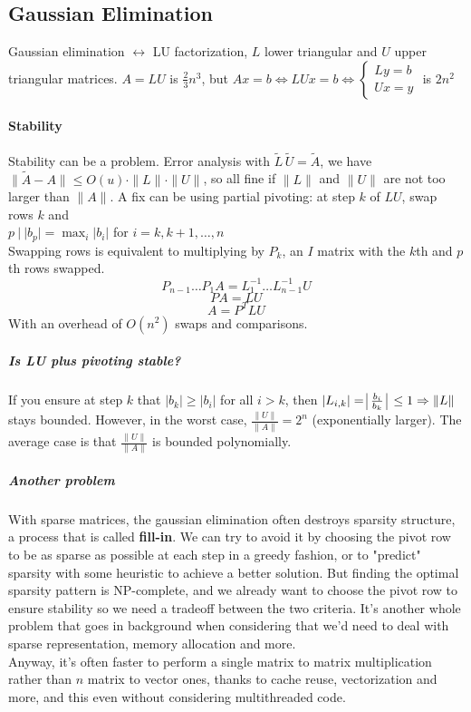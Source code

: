 \documentclass[10pt]{report}
\begin{document}
\subsection{Gaussian Elimination}
Gaussian elimination $\leftrightarrow$ LU factorization, $L$ lower triangular and $U$ upper triangular matrices. $A = LU$ is $\frac{2}{3}n^3$, but $Ax=b\Leftrightarrow LUx = b\Leftrightarrow\left\{\begin{array}{l}
Ly=b\\Ux=y
\end{array}\right.$ is $2n^2$
\paragraph{Stability} Stability can be a problem. Error analysis with $\tilde{L}\,\tilde{U} = \tilde{A}$, we have $\|\tilde{A}-A\|\leq O(u)\cdot\|L\|\cdot\|U\|$, so all fine if $\|L\|$ and $\|U\|$ are not too larger than $\|A\|$. A fix can be using partial pivoting: at step $k$ of $LU$, swap rows $k$ and\\$p\:|\:|b_p|=\max_i|b_i|$ for $i=k,k+1,\ldots,n$\\
Swapping rows is equivalent to multiplying by $P_k$, an $I$ matrix with the $k$th and $p$th rows swapped.
$$P_{n-1}\ldots P_1A=L_1^{-1}\ldots L_{n-1}^{-1}U$$
$$PA = LU$$
$$A = P^TLU$$
With an overhead of $O(n^2)$ swaps and comparisons.
\subparagraph{Is LU plus pivoting stable?} If you ensure at step $k$ that $|b_k|\geq |b_i|$ for all $i>k$, then $|L_{i,k}| = \:\vline\frac{b_i}{b_k}\:\vline\:\leq 1 \Rightarrow \|L\|$ stays bounded. However, in the worst case, $\frac{\|U\|}{\|A\|} = 2^n$ (exponentially larger). The average case is that $\frac{\|U\|}{\|A\|}$ is bounded polynomially.
\subparagraph{Another problem} With sparse matrices, the gaussian elimination often destroys sparsity structure, a process that is called \textbf{fill-in}. We can try to avoid it by choosing the pivot row to be as sparse as possible at each step in a greedy fashion, or to "predict" sparsity with some heuristic to achieve a better solution. But finding the optimal sparsity pattern is NP-complete, and we already want to choose the pivot row to ensure stability so we need a tradeoff between the two criteria. It's another whole problem that goes in background when considering that we'd need to deal with sparse representation, memory allocation and more.\\
Anyway, it's often faster to perform a single matrix to matrix multiplication rather than $n$ matrix to vector ones, thanks to cache reuse, vectorization and more, and this even without considering multithreaded code.
\end{document}
